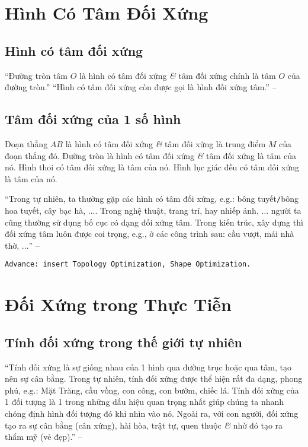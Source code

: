 \documentclass[oneside]{book}
\numberwithin{equation}{section}
\begin{document}

\section{Hình Có Tâm Đối Xứng}

\subsection{Hình có tâm đối xứng}
``Đường tròn tâm $O$ là hình có tâm đối xứng \textit{\&} tâm đối xứng chính là tâm $O$ của đường tròn.'' ``Hình có tâm đối xứng còn được gọi là hình đối xứng tâm.'' -- \cite[p. 111]{Thai_Anh_Dat_Ha_Loan_Nam_Quang_Toan_6_tap_1}

\subsection{Tâm đối xứng của 1 số hình}
Đoạn thẳng $AB$ là hình có tâm đối xứng \textit{\&} tâm đối xứng là trung điểm $M$ của đoạn thẳng đó. Đường tròn là hình có tâm đối xứng \textit{\&} tâm đối xứng là tâm của nó. Hình thoi có tâm đối xứng là tâm của nó. Hình lục giác đều có tâm đối xứng là tâm của nó.

``Trong tự nhiên, ta thường gặp các hình có tâm đối xứng, e.g.: bông tuyết\texttt{/}bông hoa tuyết, cây bạc hà, $\ldots$. Trong nghệ thuật, trang trí, hay nhiếp ảnh, $\ldots$ người ta cũng thường sử dụng bố cục có dạng đối xứng tâm. Trong kiến trúc, xây dựng thì đối xứng tâm luôn được coi trọng, e.g., ở các công trình sau: cầu vượt, mái nhà thờ, $\ldots$'' -- \cite[p. 113]{Thai_Anh_Dat_Ha_Loan_Nam_Quang_Toan_6_tap_1}

\texttt{Advance: insert Topology Optimization, Shape Optimization.}


\section{Đối Xứng trong Thực Tiễn}

\subsection{Tính đối xứng trong thế giới tự nhiên}
``Tính đối xứng là sự giống nhau của 1 hình qua đường trục hoặc qua tâm, tạo nên sự cân bằng. Trong tự nhiên, tính đối xứng được thể hiện rất đa dạng, phong phú, e.g.: Mặt Trăng, cầu vồng, con công, con bướm, chiếc lá. Tính đối xứng của 1 đối tượng là 1 trong những dấu hiệu quan trọng nhất giúp chúng ta nhanh chóng định hình đối tượng đó khi nhìn vào nó. Ngoài ra, với con người, đối xứng tạo ra sự cân bằng (cân xứng), hài hòa, trật tự, quen thuộc \textit{\&} nhờ đó tạo ra thẩm mỹ (vẻ đẹp).'' -- \cite[p. 114]{Thai_Anh_Dat_Ha_Loan_Nam_Quang_Toan_6_tap_1}
\end{document}
